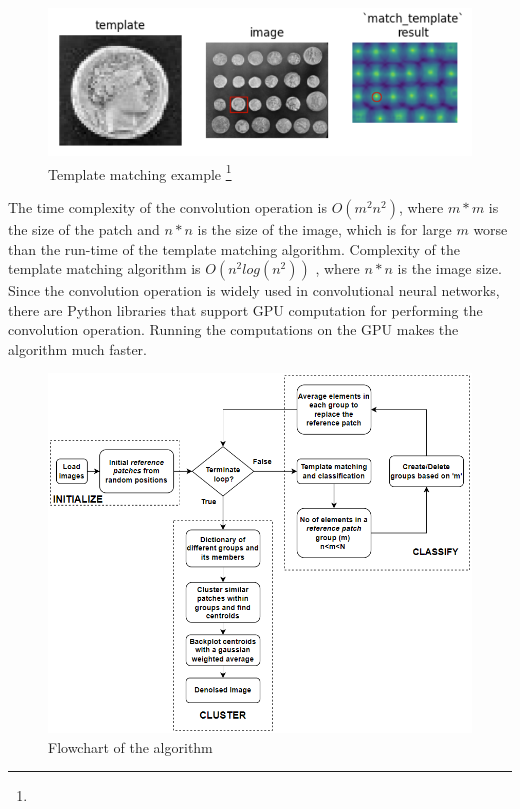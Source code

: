 \documentclass[fleqn,10pt]{wlscirep}
\begin{document}
\begin{figure}
	\centering
	\includegraphics[scale=0.8]{./imgs/template_matching.png}
	\caption[Template matching example]{Template matching example \footnote{\footnotemark} }
	\label{fig:template_matching}
\end{figure} 


The time complexity of the convolution operation is $O(m^2n^2)$, where $m*m$ is the size of the patch and $n*n$ is the size of the image, which is for large $m$ worse than the run-time of the template matching algorithm. Complexity of the template matching algorithm is $O(n^2log(n^2))$ \cite{template_matching}, where $n*n$ is the image size. Since the convolution operation is widely used in convolutional neural networks, there are Python libraries that support GPU computation for performing the convolution operation. Running the computations on the GPU makes the algorithm much faster.

\begin{figure}
	\centering
	\includegraphics[scale=0.7]{./imgs/flowchart.png}
	\caption{Flowchart of the algorithm}
	\label{fig:flowchart}
\end{figure} 
\end{document}
